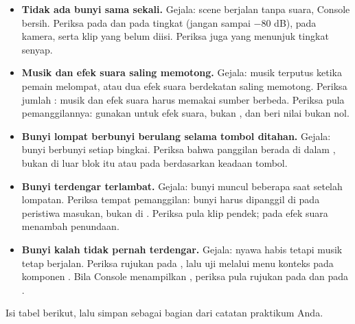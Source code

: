 \begin{galatbox}
\begin{itemize}[leftmargin=1.4em, itemsep=0.35em]
  \item \textbf{Tidak ada bunyi sama sekali.}
        Gejala: scene berjalan tanpa suara, Console bersih. Periksa
         pada  dan pada tingkat
         (jangan sampai $-80$ dB),  pada
         kamera, serta klip yang belum diisi. Periksa juga
         yang menunjuk tingkat senyap.
  \item \textbf{Musik dan efek suara saling memotong.}
        Gejala: musik terputus ketika pemain melompat, atau dua efek suara
        berdekatan saling memotong. Periksa jumlah : musik
        dan efek suara harus memakai sumber berbeda. Periksa pula
        pemanggilannya: gunakan  untuk efek suara, bukan
        , dan beri  nilai bukan nol.
  \item \textbf{Bunyi lompat berbunyi berulang selama tombol ditahan.}
        Gejala: bunyi berbunyi setiap bingkai. Periksa bahwa panggilan berada
        di dalam , bukan di luar blok itu atau pada
         berdasarkan keadaan tombol.
  \item \textbf{Bunyi terdengar terlambat.}
        Gejala: bunyi muncul beberapa saat setelah lompatan. Periksa tempat
        pemanggilan: bunyi harus dipanggil di  pada peristiwa
        masukan, bukan di . Periksa pula
         klip pendek;  pada efek suara
        menambah penundaan.
  \item \textbf{Bunyi kalah tidak pernah terdengar.}
        Gejala: nyawa habis tetapi musik tetap berjalan. Periksa rujukan
         pada , lalu uji melalui menu konteks
         pada komponen .
        Bila Console menampilkan , periksa pula
        rujukan  pada  dan 
        pada .
\end{itemize}
\end{galatbox}


Isi tabel berikut, lalu simpan sebagai bagian dari catatan praktikum Anda.

